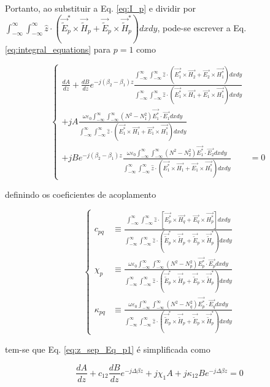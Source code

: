 \documentclass[final,12pt,times,twocolumn]{elsarticle}
\newcommand{\tildee}{ \vec{\tilde{E}}}
\newcommand{\tildeh}{ \vec{\tilde{H}}}
\newcommand{\epsz}{\varepsilon_0}
\newcommand{\couplingdenom}{ \int_{-\infty}^\infty \int_{-\infty}^\infty \hat{z}\cdot\left(\tildee_p^*\times\tildeh_p+\tildee_p\times\tildeh_p^*\right) dxdy }
\begin{document}
Portanto, ao substituir a Eq. \eqref{eq:I_p} e dividir por $ \couplingdenom $, pode-se escrever a Eq. \eqref{eq:integral_equations} para $p=1$ como

\begin{equation} 
    \left\{
    \begin{split}
        \frac{dA}{dz} + \frac{dB}{dz}e^{-j(\beta_2-\beta_1)z}\frac{\int_{-\infty}^\infty\int_{-\infty}^\infty \hat{z}\cdot\left( \vec{E_1^*}\times\vec{H_2} + \vec{E_2}\times\vec{H_1^*} \right) dxdy}{\int_{-\infty}^\infty\int_{-\infty}^\infty \hat{z}\cdot\left( \vec{E_1^*}\times\vec{H_1} + \vec{E_1}\times\vec{H_1^*} \right) dxdy} &\\
        + jA \frac{\omega\epsz  \int_{-\infty}^\infty\int_{-\infty}^\infty \left(N^2-N_1^2\right)\vec{E_1^*}\cdot\vec{E_1} dxdy}{\int_{-\infty}^\infty\int_{-\infty}^\infty \hat{z}\cdot\left( \vec{E_1^*}\times\vec{H_1} + \vec{E_1}\times\vec{H_1^*} \right) dxdy} &\\
        + jBe^{-j(\beta_2-\beta_1)z} \frac{\omega\epsz  \int_{-\infty}^\infty\int_{-\infty}^\infty \left(N^2-N_2^2\right)\vec{E_1^*}\cdot\vec{E_2} dxdy}{\int_{-\infty}^\infty\int_{-\infty}^\infty \hat{z}\cdot\left( \vec{E_1^*}\times\vec{H_1} + \vec{E_1}\times\vec{H_1^*} \right) dxdy} &= 0
    \end{split}
    \right.
    \label{eq:z_sep_Eq_p1}
\end{equation}

\noindent definindo os coeficientes de acoplamento

\begin{equation}
    \left\{
    \begin{split}
        c_{pq} &\equiv \frac{\int_{-\infty}^\infty\int_{-\infty}^\infty \hat{z} \cdot \left[ \vec{E_p^*}\times\vec{H_q} + \vec{E_q}\times\vec{H_p^*} \right] dxdy}{\couplingdenom} \\
        \chi_{p} &\equiv \frac{\omega\epsz\int_{-\infty}^\infty\int_{-\infty}^\infty \left(N^2-N_p^2\right) \vec{E_p^*}\cdot\vec{E_p} dxdy}{\couplingdenom} \\
        \kappa_{pq} &\equiv \frac{\omega\epsz\int_{-\infty}^\infty\int_{-\infty}^\infty \left(N^2-N_q^2\right) \vec{E_p^*}\cdot\vec{E_q} dxdy}{\couplingdenom}
    \end{split} 
    \right.
    \label{eq:coupling_coeff}
\end{equation}

tem-se que Eq. \eqref{eq:z_sep_Eq_p1} é simplificada como

\begin{equation}
    \frac{dA}{dz} + c_{12}\frac{dB}{dz}e^{-j\Delta\beta z} + j\chi_1A + j\kappa_{12}Be^{-j\Delta\beta z} = 0
\end{equation}
\end{document}
